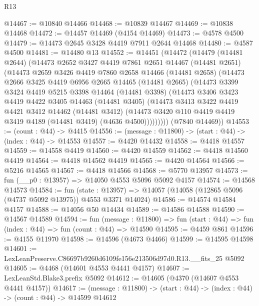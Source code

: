 \begin{lexlean}{R13}
\begin{coremodule}
@14467 := @10840 @14466
@14468 := @10839 @14467
@14469 := @10838 @14468
@14472 := @14457 @14469 (@4154 @14469)
@14473 := @4578 @4500
@14479 := @14473 @2645 @3428 @4419 @7911 @2644 @14468
@14480 := @4587 @4500
@14481 := @14480 @13
@14552 := @14451
    (@14472
      (@14479
        (@14481 @2644)
        (@14473
          @2652
          @3427
          @4419
          @7861
          @2651
          @14467
          (@14481 @2651)
          (@14473
            @2659
            @3426
            @4419
            @7860
            @2658
            @14466
            (@14481 @2658)
            (@14473
              @2666
              @3425
              @4419
              @6956
              @2665
              @14465
              (@14481 @2665)
              (@14473
                @3399
                @3424
                @4419
                @5215
                @3398
                @14464
                (@14481 @3398)
                (@14473
                  @3406
                  @3423
                  @4419
                  @4422
                  @3405
                  @14463
                  (@14481 @3405)
                  (@14473
                    @3413
                    @3422
                    @4419
                    @4421
                    @3412
                    @14462
                    (@14481 @3412)
                    (@14473 @3420 @110 @4419 @4419 @3419 @4189 (@14481 @3419) (@4636 @4500)))))))))
      (@7840 @14469))
@14553 := (count : @44) -> @4415
@14556 := (message : @11800) -> (start : @44) -> (index : @44) -> @14553
@14557 := @4420 @14432
@14558 := @4418 @14557
@14559 := @14558 @4419
@14560 := @4420 @14559
@14562 := @4418 @14560 @4419
@14564 := @4418 @14562 @4419
@14565 := @4420 @14564
@14566 := @5216 @14565
@14567 := @4418 @14566
@14568 := @5770 @13957
@14573 := fun (__p0 : @13957) => @14050 @4553 @5096 @5092 @4157
@14574 := @14568 @14573
@14584 := fun (state : @13957) =>
  @14057 (@14058 (@12865 @5096 (@4737 @5092 @13975)) @4553 @3371 @14024)
@14586 := @14574 @14584 @4157
@14588 := @14056 @50 @14434
@14589 := @14586 @14588
@14590 := @14567 @14589
@14594 := fun (message : @11800) =>
  fun (start : @44) => fun (index : @44) => fun (count : @44) => @14590
@14595 := @4459 @861
@14596 := @4155 @11970
@14598 := @14596 (@4673 @4466)
@14599 := @14595 @14598
@14601 := LexLeanPreserve.C86697b9260d6109fe156e213506d97d0.R13.__fits_25 @5092
@14605 := @4468 (@14601 @4553 @4441 @4157)
@14607 := LexLeanStd.Blake3.prefix @5092
@14612 := @14605 (@4370 (@14607 @4553 @4441 @4157))
@14617 := (message : @11800) -> (start : @44) -> (index : @44) -> (count : @44) -> @14599 @14612

\end{coremodule}
\end{lexlean}
